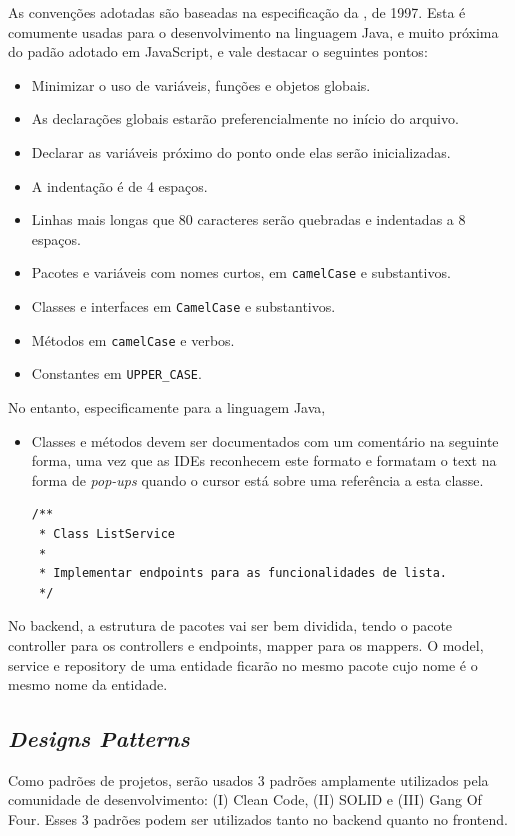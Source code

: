 As convenções adotadas são baseadas na especificação da
\citeauthor{Oracle1997}, de 1997. Esta é comumente usadas para o
desenvolvimento na linguagem Java, e muito próxima do padão adotado em
JavaScript, e vale destacar o seguintes pontos:
\begin{itemize}
\item Minimizar o uso de variáveis, funções e objetos globais.
\item As declarações globais estarão preferencialmente no início do arquivo.
\item Declarar as variáveis próximo do ponto onde elas serão inicializadas.
\item A indentação é de 4 espaços.
\item Linhas mais longas que 80 caracteres serão quebradas e
  indentadas a 8 espaços.
\item Pacotes e variáveis com nomes curtos, em \texttt{camelCase} e substantivos.
\item Classes e interfaces em \texttt{CamelCase} e substantivos.
\item Métodos em \texttt{camelCase} e verbos.
\item Constantes em \texttt{UPPER\_CASE}.
\end{itemize}

No entanto, especificamente para a linguagem Java,
\begin{itemize}
\item Classes e métodos devem ser documentados com um comentário na
  seguinte forma, uma vez que as IDEs reconhecem este formato e
  formatam o text na forma de \emph{pop-ups} quando o cursor está
  sobre uma referência a esta classe.
\begin{verbatim}
/**
 * Class ListService
 *
 * Implementar endpoints para as funcionalidades de lista.
 */
\end{verbatim}
\end{itemize}

No backend, a estrutura de pacotes vai ser bem dividida, tendo o pacote controller para os controllers e endpoints, mapper para os mappers. O model, service e repository de uma entidade ficarão no mesmo pacote cujo nome é o mesmo nome da entidade.

\subsection{\emph{Designs Patterns}}

Como padrões de projetos, serão usados 3 padrões amplamente utilizados pela comunidade de desenvolvimento: (I) Clean Code, (II) SOLID e (III) Gang Of Four. Esses 3 padrões podem ser utilizados tanto no backend quanto no frontend.

